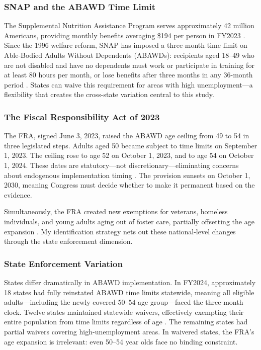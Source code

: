 \documentclass[12pt]{article}
\begin{document}
\subsubsection*{SNAP and the ABAWD Time Limit} The Supplemental Nutrition Assistance Program serves approximately 42 million Americans, providing monthly benefits averaging \$194 per person in FY2023 \citep{usda2023snap}. Since the 1996 welfare reform, SNAP has imposed a three-month time limit on Able-Bodied Adults Without Dependents (ABAWDs): recipients aged 18--49 who are not disabled and have no dependents must work or participate in training for at least 80 hours per month, or lose benefits after three months in any 36-month period \citep{rosenbaum2019snap}. States can waive this requirement for areas with high unemployment---a flexibility that creates the cross-state variation central to this study.

\subsubsection*{The Fiscal Responsibility Act of 2023} The FRA, signed June 3, 2023, raised the ABAWD age ceiling from 49 to 54 in three legislated steps. Adults aged 50 became subject to time limits on September 1, 2023. The ceiling rose to age 52 on October 1, 2023, and to age 54 on October 1, 2024. These dates are statutory---not discretionary---eliminating concerns about endogenous implementation timing \citep{crs2023fra}. The provision sunsets on October 1, 2030, meaning Congress must decide whether to make it permanent based on the evidence.

Simultaneously, the FRA created new exemptions for veterans, homeless individuals, and young adults aging out of foster care, partially offsetting the age expansion \citep{cbpp2023fra}. My identification strategy nets out these national-level changes through the state enforcement dimension.

\subsubsection*{State Enforcement Variation} States differ dramatically in ABAWD implementation. In FY2024, approximately 18 states had fully reinstated ABAWD time limits statewide, meaning all eligible adults---including the newly covered 50--54 age group---faced the three-month clock. Twelve states maintained statewide waivers, effectively exempting their entire population from time limits regardless of age \citep{fns2024waivers}. The remaining states had partial waivers covering high-unemployment areas. In waivered states, the FRA's age expansion is irrelevant: even 50--54 year olds face no binding constraint.
\end{document}

